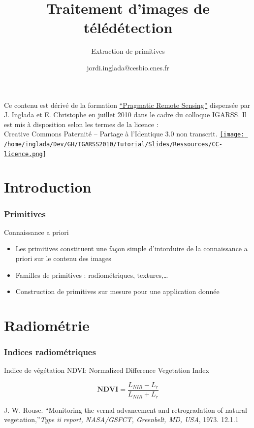 \documentclass[compress]{beamer}
\title{Traitement d'images de télédétection}
\subtitle{Extraction de primitives}
\author
{jordi.inglada@cesbio.cnes.fr}
\institute[Cesbio] %
{\textsc{Centre d'Études Spatiales de la Biosphère, Toulouse, France}}
\date{}
\begin{document}
\begin{frame}
  \titlepage
  \begin{center}
{\tiny Ce contenu est dérivé de la formation \href{http://www.orfeo-toolbox.org/packages/PragmaticRemoteSensing-handout.pdf}{``Pragmatic Remote
  Sensing''} dispensée par J. Inglada et E. Christophe en juillet 2010
  dans le cadre du colloque IGARSS. Il est mis à disposition selon les termes de la licence :\\
Creative Commons Paternité – Partage à l’Identique 3.0 non transcrit.} \href{http://creativecommons.org/licenses/by-sa/3.0/}{\texttt{[image: /home/inglada/Dev/GH/IGARSS2010/Tutorial/Slides/Ressources/CC-licence.png]}}    
  \end{center}
\end{frame}

\section{Introduction}

\begin{frame}
\frametitle{Primitives}

\begin{block}{Connaissance a priori}
\begin{itemize}
\item Les primitives constituent une façon simple d'intorduire de la
  connaissance a priori sur le contenu des images
\item Familles de primitives : radiométriques, textures,\ldots
\item Construction de primitives sur mesure pour une application donnée
\end{itemize}
\end{block}

\end{frame}

\section{Radiométrie}

\begin{frame}
\frametitle{Indices radiométriques}
Indice de végétation NDVI: Normalized Difference Vegetation Index \cite{Rouse1973-NDVI}

\begin{equation}
 \mathbf{NDVI} = \frac{L_{NIR}-L_{r}}{L_{NIR}+L_{r}}
 \end{equation}

\begin{thebibliography}{noidea}
\footnotesize
{}
J. W. Rouse. ``Monitoring the vernal advancement and retrogradation of natural vegetation,''{\em Type ii report, NASA/GSFCT, Greenbelt, MD, USA}, 1973. 12.1.1
\end{thebibliography}

\end{frame}
\end{document}
